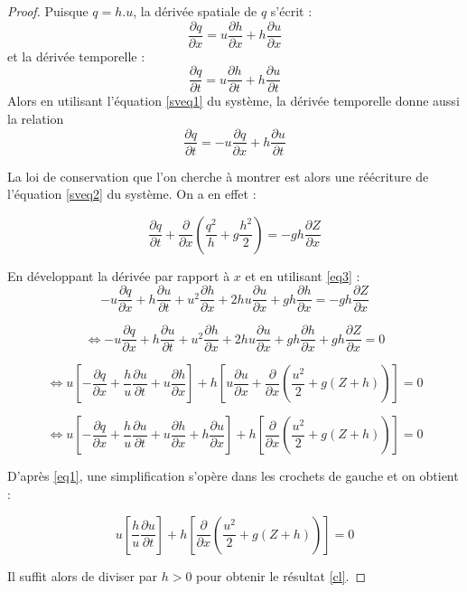 \documentclass[
11pt, %
francais, %
singlespacing, %
headsepline, %
]{MastersDoctoralThesis} %
\begin{document}
\begin{proof}
Puisque $q=h.u$, la dérivée spatiale de $q$ s'écrit : \begin{equation}\frac{\partial q}{\partial x} = u\frac{\partial h}{\partial x}+h\frac{\partial u}{\partial x} \label{eq1}\end{equation}
et la dérivée temporelle : \begin{equation} \frac{\partial q}{\partial t} =  u\frac{\partial h}{\partial t} +  h\frac{\partial u}{\partial t} \label{eq2} \end{equation}
Alors en utilisant l'équation \ref{sveq1} du système, la dérivée temporelle donne aussi la relation \begin{equation}  \frac{\partial q}{\partial t}=-u\frac{\partial q}{\partial x}+h\frac{\partial u}{\partial t} \label{eq3}\end{equation}

La loi de conservation que l'on cherche à montrer est alors une réécriture de l'équation \ref{sveq2} du système. On a en effet :

$$
\frac{\partial q}{\partial t} + \frac{\partial }{\partial x}(\frac{q^{2}}{h}+g\frac{h^{2}}{2}) = -gh\frac{\partial Z}{\partial x}
$$

En développant la dérivée par rapport à $x$ et en utilisant \eqref{eq3} : 
$$
-u\frac{\partial q}{\partial x}+h\frac{\partial u}{\partial t}+u^{2}\frac{\partial h }{\partial x}+2hu\frac{\partial u}{\partial x} +gh\frac{\partial h}{\partial x}= -gh\frac{\partial Z}{\partial x}
$$

$$
\Leftrightarrow -u\frac{\partial q}{\partial x}+h\frac{\partial u}{\partial t}+u^{2}\frac{\partial h }{\partial x}+2hu\frac{\partial u}{\partial x} +gh\frac{\partial h}{\partial x} + gh\frac{\partial Z}{\partial x} =0
$$

$$
\Leftrightarrow u\left[-\frac{\partial q}{\partial x}+\frac{h}{u}\frac{\partial u}{\partial t}+u\frac{\partial h }{\partial x}\right]+h\left[u \frac{\partial u}{\partial x}+\frac{\partial}{\partial x}(\frac{u^{2}}{2}+g(Z+h))\right] =0
$$

$$
\Leftrightarrow u\left[-\frac{\partial q}{\partial x}+\frac{h}{u}\frac{\partial u}{\partial t}+u\frac{\partial h }{\partial x} + h\frac{\partial u }{\partial x}\right]+h\left[\frac{\partial}{\partial x}(\frac{u^{2}}{2}+g(Z+h))\right] =0
$$


D'après \eqref{eq1}, une simplification s'opère dans les crochets de gauche et on obtient :

$$
u\left[\frac{h}{u}\frac{\partial u}{\partial t}\right]+h\left[\frac{\partial}{\partial x}(\frac{u^{2}}{2}+g(Z+h))\right] =0
$$

Il suffit alors de diviser par $h>0$ pour obtenir le résultat \eqref{cl}.

\end{proof}
\end{document}
